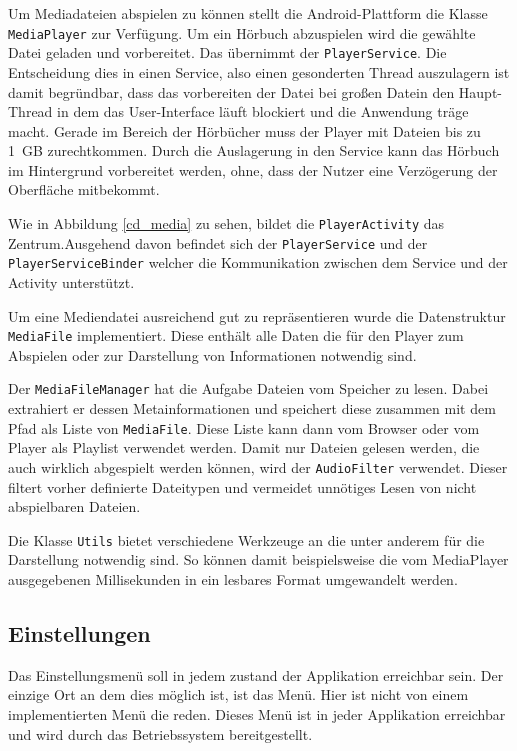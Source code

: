 Um Mediadateien abspielen zu können stellt die Android-Plattform die Klasse \verb+MediaPlayer+ zur Verfügung. Um ein Hörbuch abzuspielen wird die gewählte Datei geladen und vorbereitet. Das übernimmt der \verb+PlayerService+. Die Entscheidung dies in einen Service, also einen gesonderten Thread auszulagern ist damit begründbar, dass das vorbereiten der Datei bei großen Datein den Haupt-Thread in dem das User-Interface läuft blockiert und die Anwendung träge macht. Gerade im Bereich der Hörbücher muss der Player mit Dateien bis zu \SI{1}{GB} zurechtkommen. Durch die Auslagerung in den Service kann das Hörbuch im Hintergrund vorbereitet werden, ohne, dass der Nutzer eine Verzögerung der Oberfläche mitbekommt.

Wie in Abbildung \ref{cd_media} zu sehen, bildet die \verb+PlayerActivity+ das Zentrum.Ausgehend davon befindet sich der \verb+PlayerService+ und der \verb+PlayerServiceBinder+ welcher die Kommunikation zwischen dem Service und der Activity unterstützt.

Um eine Mediendatei ausreichend gut zu repräsentieren wurde die Datenstruktur \verb+MediaFile+ implementiert. Diese enthält alle Daten die für den Player zum Abspielen oder zur Darstellung von Informationen notwendig sind. 

Der \verb+MediaFileManager+ hat die Aufgabe Dateien vom Speicher zu lesen. Dabei extrahiert er dessen Metainformationen und speichert diese zusammen mit dem Pfad als Liste von \verb+MediaFile+. Diese Liste kann dann vom Browser oder vom Player als Playlist verwendet werden. Damit nur Dateien gelesen werden, die auch wirklich abgespielt werden können, wird der \verb+AudioFilter+ verwendet. Dieser filtert vorher definierte Dateitypen und vermeidet unnötiges Lesen von nicht abspielbaren Dateien.

Die Klasse \verb+Utils+ bietet verschiedene Werkzeuge an die unter anderem für die Darstellung notwendig sind. So können damit beispielsweise die vom MediaPlayer ausgegebenen Millisekunden in ein lesbares Format umgewandelt werden.

\subsection{Einstellungen}
Das Einstellungsmenü soll in jedem zustand der Applikation erreichbar sein. Der einzige Ort an dem dies möglich ist, ist das Menü. Hier ist nicht von einem implementierten Menü die reden. Dieses Menü ist in jeder Applikation erreichbar und wird durch das Betriebssystem bereitgestellt.

